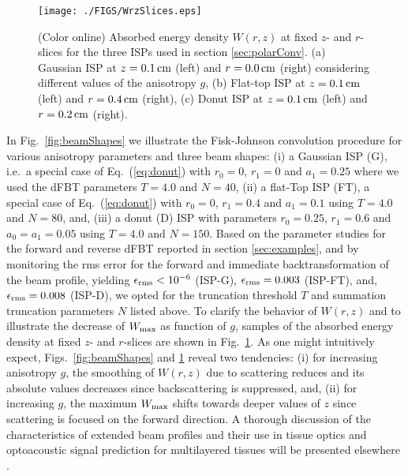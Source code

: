 \documentclass[12pt]{iopart}
\begin{document}
%
%
\begin{figure}[t!]
\centerline{\texttt{[image: ./FIGS/WrzSlices.eps]} } 
\caption{(Color online) Absorbed energy density $W(r,z)$ at fixed $z$- and 
$r$-slices for the three ISPs used in section \ref{sec:polarConv}.
(a) Gaussian ISP at $z=0.1\,{\rm{cm}}$ (left) and 
$r=0.0\,{\rm{cm}}$ (right) considering different values of the anisotropy $g$,
(b) Flat-top ISP at $z=0.1\,{\rm{cm}}$ (left) and 
$r=0.4\,{\rm{cm}}$ (right),
(c) Donut ISP at $z=0.1\,{\rm{cm}}$ (left) and 
$r=0.2\,{\rm{cm}}$ (right).
}
\label{fig:WSlices}
\end{figure}

In Fig.~\ref{fig:beamShapes} we illustrate the Fisk-Johnson convolution
procedure for various anisotropy parameters and three beam shapes:
(i) a Gaussian ISP (G), i.e.\ a special case of Eq.~(\ref{eq:donut}) with
$r_0=0$, $r_1=0$ and $a_1=0.25$ where we used the dFBT parameters $T=4.0$ 
and $N=40$,
(ii) a flat-Top ISP (FT), a special 
case of Eq.~(\ref{eq:donut}) with $r_0=0$, $r_1=0.4$ and $a_1=0.1$ using 
$T=4.0$ and $N=80$,
and,
(iii) a donut (D) ISP with parameters $r_0=0.25$, $r_1=0.6$ and $a_0=a_1=0.05$ 
using $T=4.0$ and $N=150$.
Based on the parameter studies for the forward and reverse dFBT reported in
section \ref{sec:examples}, and by monitoring the rms error for the forward and
immediate backtransformation of the beam profile, yielding $\epsilon_{\rm
rms}<10^{-6}$ (ISP-G), $\epsilon_{\rm rms}=0.003$ (ISP-FT), and, $\epsilon_{\rm
rms}=0.008$ (ISP-D), we opted for the truncation threshold $T$ and summation
truncation parameters $N$ listed above. 
To clarify the behavior of $W(r,z)$ and to illustrate the decrease of $W_{\rm
max}$ as function of $g$, samples of the absorbed energy density at fixed $z$-
and $r$-slices are shown in Fig.~\ref{fig:WSlices}. As one might intuitively
expect, Figs.~\ref{fig:beamShapes} and \ref{fig:WSlices} reveal two tendencies:
(i) for increasing anisotropy $g$, the smoothing of $W(r,z)$ due to scattering
reduces and its absolute values decreases since backscattering is suppressed, 
and, (ii) for increasing $g$, the maximum $W_{\rm max}$ shifts towards deeper 
values of $z$ since scattering is focused on the forward direction.
  A thorough discussion of the characteristics of extended beam profiles and
their use in tissue optics and optoacoustic signal prediction for multilayered
tissues will be presented elsewhere \cite{MelchertOA:2016}.
\end{document}
